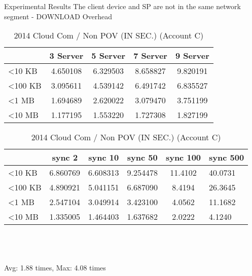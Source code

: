 \begin{frame}{Experimental Results}
{The client device and SP are \alert{not} in the same network segment - DOWNLOAD Overhead}
	\scriptsize
    \begin{table}[]
    \centering
    \caption{My Method / Non POV (IN SEC.) (Account C)}
    \begin{tabular}{lcccc}
                         & 3 Server & 5 Server & 7 Server & 9 Server \\ \hline
        \textless 10 KB  & 4.650108 & 6.329503 & 8.658827 & 9.820191 \\ \hline
        \textless 100 KB & 3.095611 & 4.539142 & 6.491742 & 6.835527 \\ \hline
        \textless 1 MB   & 1.694689 & 2.620022 & 3.079470 & 3.751199 \\ \hline
        \textless 10 MB  & 1.177195 & 1.553220 & 1.727308 & 1.827199 \\ \hline
    \end{tabular}
    \caption{2014 Cloud Com / Non POV (IN SEC.) (Account C)}
    \begin{tabular}{lccccl}
                         & sync 2   & sync 10  & sync 50  & sync 100 & sync 500 \\ \hline
        \textless 10 KB  & 6.860769 & 6.608313 & 9.254478 & 11.4102  & 40.0731  \\ \hline
        \textless 100 KB & 4.890921 & 5.041151 & 6.687090 & 8.4194   & 26.3645  \\ \hline
        \textless 1 MB   & 2.547104 & 3.049914 & 3.423100 & 4.0562   & 11.1682  \\ \hline
        \textless 10 MB  & 1.335005 & 1.464403 & 1.637682 & 2.0222   & 4.1240   \\ \hline
    \end{tabular}
    ~\\
    ~\\
    ~\\
    \alert{Avg: 1.88 times, Max: 4.08 times}
    \end{table}
\end{frame}